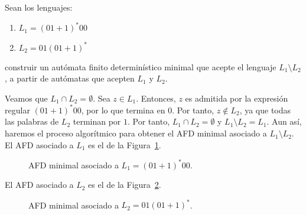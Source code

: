\begin{ejercicio}\label{ej:1.3.15}
    Sean los lenguajes:
    \begin{enumerate}
        \item $L_1={(01+1)}^{\ast}00$
        \item $L_2=01{(01+1)}^{\ast}$
    \end{enumerate}
    construir un autómata finito determinístico minimal que acepte el lenguaje $L_1 \setminus L_2$, a partir de autómatas que acepten $L_1$ y $L_2$.

    Veamos que $L_1\cap L_2=\emptyset$. Sea $z\in L_1$. Entonces, $z$ es admitida por la expresión regular $(01+1)^{\ast}00$, por lo que termina en $0$. Por tanto, $z\notin L_2$, ya que todas las palabras de $L_2$ terminan por $1$. Por tanto, $L_1\cap L_2=\emptyset$ y $L_1\setminus L_2=L_1$. Aun así, haremos el proceso algorítmico para obtener el AFD minimal asociado a $L_1\setminus L_2$.\\

    El AFD asociado a $L_1$ es el de la Figura~\ref{fig:1.3.15-L1}.
    \begin{figure}[H]
        \centering
        \caption{AFD minimal asociado a $L_1={(01+1)}^{\ast}00$.}
        \label{fig:1.3.15-L1}
    \end{figure}

    El AFD asociado a $L_2$ es el de la Figura~\ref{fig:1.3.15-L2}.
    \begin{figure}[H]
        \centering
        \caption{AFD minimal asociado a $L_2=01{(01+1)}^{\ast}$.}
        \label{fig:1.3.15-L2}
    \end{figure}


\end{ejercicio}

